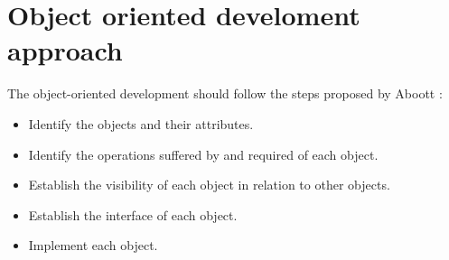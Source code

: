 \section{Object oriented develoment approach}

The object-oriented development should 
follow the steps proposed by Aboott \cite{Abbott:1980}:  

\begin{itemize}
  \item Identify the objects and their attributes.
  \item Identify the operations suffered by and required
		of each object.
  \item Establish the visibility of each object in 
		relation to other objects.
  \item Establish the interface of each object.
  \item Implement each object.  
\end{itemize}

